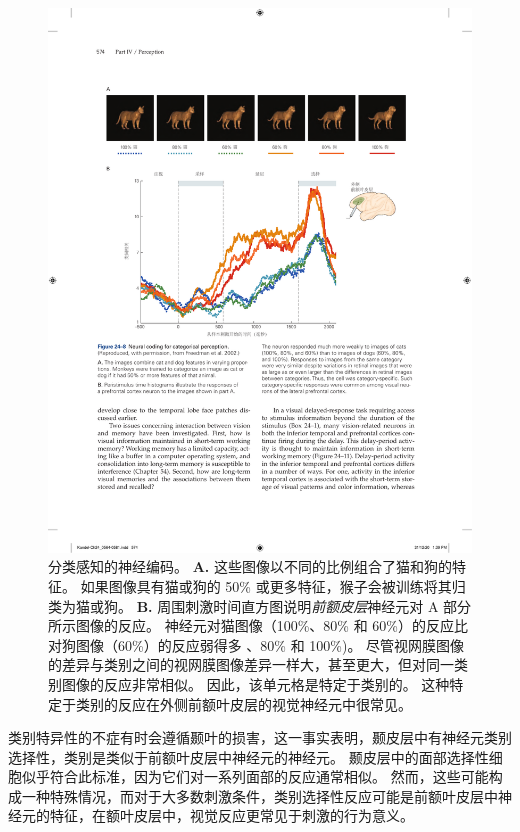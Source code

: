 \begin{figure}[htbp]
	\centering
	\includegraphics[width=1.0\linewidth]{chap24/fig_24_8}
	\caption{分类感知的神经编码。
		\textbf{A.} 这些图像以不同的比例组合了猫和狗的特征。
		如果图像具有猫或狗的 50\% 或更多特征，猴子会被训练将其归类为猫或狗。
		\textbf{B.} 周围刺激时间直方图说明\textit{前额皮层}神经元对 A 部分所示图像的反应。
		神经元对猫图像（100\%、80\% 和 60\%）的反应比对狗图像（60\%）的反应弱得多 、80\% 和 100\%)。
		尽管视网膜图像的差异与类别之间的视网膜图像差异一样大，甚至更大，但对同一类别图像的反应非常相似。
		因此，该单元格是特定于类别的。
		这种特定于类别的反应在外侧前额叶皮层的视觉神经元中很常见。}
	\label{fig:24_8}
\end{figure}


类别特异性的不症有时会遵循颞叶的损害，这一事实表明，颞皮层中有神经元类别选择性，类别是类似于前额叶皮层中神经元的神经元。
颞皮层中的面部选择性细胞似乎符合此标准，因为它们对一系列面部的反应通常相似。
然而，这些可能构成一种特殊情况，而对于大多数刺激条件，类别选择性反应可能是前额叶皮层中神经元的特征，在额叶皮层中，视觉反应更常见于刺激的行为意义。



